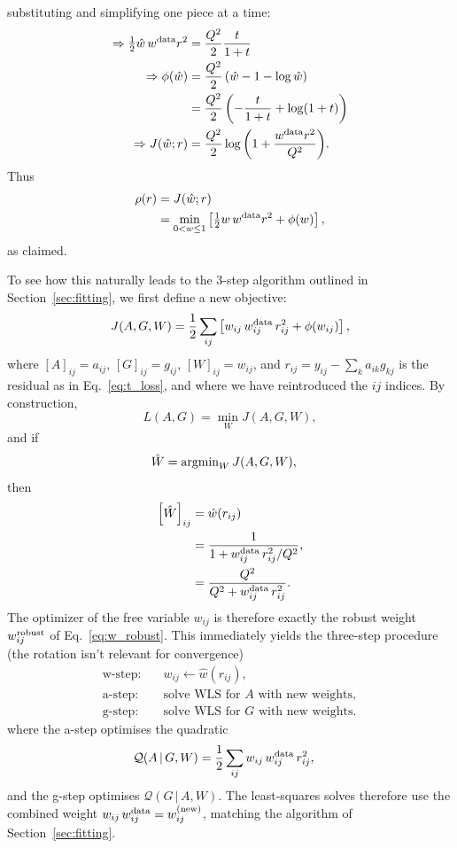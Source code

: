 \documentclass[onecolumn,floatfix,linenumbers,trackchanges]{aastex631}
\begin{document}
substituting and simplifying one piece at a time:
\begin{align}
    \Rightarrow \tfrac{1}{2} \hat{w}\, w^{\rm data} r^2 &= \frac{Q^2}{2} \frac{t}{1 + t} \\
    \Rightarrow \phi(\hat{w}) &= \frac{Q^2}{2} \left( \hat{w} - 1 - \log{\hat{w}} \right) \\
    &= \frac{Q^2}{2} \left( -\frac{t}{1 + t} + \log(1 + t) \right) \\
    \Rightarrow J (\hat{w} ; r) &= \frac{Q^2}{2} \log{\left( 1 + \frac{w^{\rm data} r^2}{Q^2} \right)}.
\end{align}
Thus
\begin{align}
    \rho(r) &= J ( \hat{w} ; r ) \\
    &= \min_{0<w\leq1} \left[ \tfrac{1}{2} w\, w^{\rm data} r^2 + \phi(w) \right],
\end{align}
as claimed.

To see how this naturally leads to the 3-step algorithm outlined in Section~\ref{sec:fitting}, we first define a new objective:
\begin{equation}
    J(A,G,W) = \frac{1}{2}\sum_{ij} \left[ w_{ij}\, w_{ij}^{\rm data}\, r_{ij}^2 + \phi(w_{ij}) \right],
\end{equation}
where $[A]_{ij} = a_{ij}$, $[G]_{ij} = g_{ij}$, $[W]_{ij} = w_{ij}$, and $r_{ij} = y_{ij} - \sum_{k} a_{ik} g_{kj}$ is the residual as in Eq.~\eqref{eq:t_loss}, and where we have reintroduced the $ij$ indices.
By construction,
\begin{equation}
    L(A,G) = \min_W J(A,G,W),
\end{equation}
and if
\begin{align}
    \hat{W} &= {\rm argmin}_W \, J(A, G, W),
\end{align}
then
\begin{align}
    \left[ \hat{W} \right]_{ij} &= \hat{w} (r_{ij}) \\
    &= \frac{1}{1 + w_{ij}^{\rm data}\, r_{ij}^2 / Q^2}, \\
    &= \frac{Q^2}{Q^2 + w_{ij}^{\rm data}\, r_{ij}^2}.
\end{align}
The optimizer of the free variable $w_{ij}$ is therefore exactly the robust weight $w_{ij}^{\rm robust}$ of Eq.~\eqref{eq:w_robust}.
This immediately yields the three-step procedure (the rotation isn't relevant for convergence)
\begin{align*}
    \text{w-step:} \quad & w_{ij} \leftarrow \hat{w}(r_{ij}), \\
    \text{a-step:} \quad & \text{solve WLS for $A$ with new weights}, \\
    \text{g-step:} \quad & \text{solve WLS for $G$ with new weights}.
\end{align*}
where the a-step optimises the quadratic
\begin{align}
    \mathcal{Q}(A \, | \, G, W) &= \frac{1}{2} \sum_{ij} w_{ij}\, w_{ij}^{\rm data}\, r_{ij}^2,
\end{align}
and the g-step optimises $\mathcal{Q}(G \, | \, A, W)$.
The least-squares solves therefore use the combined weight $w_{ij}\, w_{ij}^{\rm data} = w_{ij}^{\rm (new)}$, matching the algorithm of Section~\ref{sec:fitting}.
\end{document}
